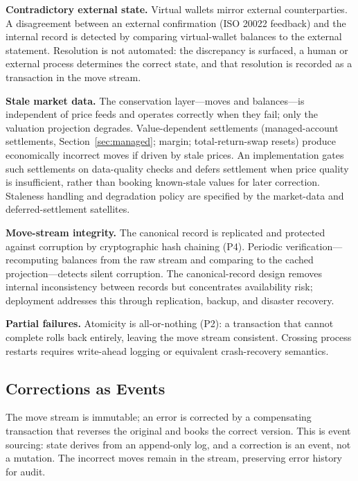 \noindent\textbf{Contradictory external state.} Virtual wallets mirror external counterparties. A disagreement between an external confirmation (ISO 20022 feedback) and the internal record is detected by comparing virtual-wallet balances to the external statement. Resolution is not automated: the discrepancy is surfaced, a human or external process determines the correct state, and that resolution is recorded as a transaction in the move stream.

\noindent\textbf{Stale market data.} The conservation layer---moves and balances---is independent of price feeds and operates correctly when they fail; only the valuation projection degrades. Value-dependent settlements (managed-account settlements, Section~\ref{sec:managed}; margin; total-return-swap resets) produce economically incorrect moves if driven by stale prices. An implementation gates such settlements on data-quality checks and defers settlement when price quality is insufficient, rather than booking known-stale values for later correction. Staleness handling and degradation policy are specified by the market-data and deferred-settlement satellites.

\noindent\textbf{Move-stream integrity.} The canonical record is replicated and protected against corruption by cryptographic hash chaining (P4). Periodic verification---recomputing balances from the raw stream and comparing to the cached projection---detects silent corruption. The canonical-record design removes internal inconsistency between records but concentrates availability risk; deployment addresses this through replication, backup, and disaster recovery.

\noindent\textbf{Partial failures.} Atomicity is all-or-nothing (P2): a transaction that cannot complete rolls back entirely, leaving the move stream consistent. Crossing process restarts requires write-ahead logging or equivalent crash-recovery semantics.

\subsection{Corrections as Events}
\label{sec:sec11-corrections}

The move stream is immutable; an error is corrected by a compensating transaction that reverses the original and books the correct version. This is event sourcing: state derives from an append-only log, and a correction is an event, not a mutation. The incorrect moves remain in the stream, preserving error history for audit.


